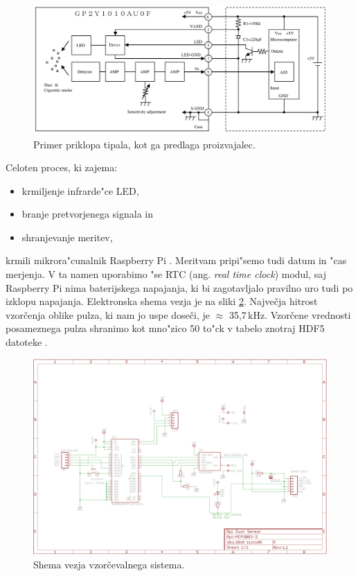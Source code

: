 \documentclass[12pt,a4paper]{article}
\begin{document}
\begin{figure}[H]
	\begin{center}
		\includegraphics[width=12cm]{integration-scheme.png}
		\caption{Primer priklopa tipala, kot ga predlaga proizvajalec.}
		\label{integration-scheme}
	\end{center}
\end{figure}

Celoten proces, ki zajema:
\begin{itemize}
	\item krmiljenje infrarde"ce LED,
	\item branje pretvorjenega signala in
	\item shranjevanje meritev,
\end{itemize}

krmili mikrora"cunalnik Raspberry Pi \cite{rbpi-wiki}. Meritvam pripi"semo tudi datum in "cas merjenja. V ta namen uporabimo "se RTC (ang. \textit{real time clock}) modul, saj Raspberry Pi nima baterijskega napajanja, ki bi zagotavljalo pravilno uro tudi po izklopu napajanja. Elektronska shema vezja je na sliki \ref{sl:shema-vezja}.
Največja hitrost vzorčenja oblike pulza, ki nam jo uspe doseči, je $ \approx $ 35,7\,kHz. Vzorčene vrednosti posameznega pulza shranimo kot mno"zico 50 to"ck v tabelo znotraj HDF5 datoteke \cite{hdf5}.


\begin{figure}[H]
	\begin{center}
		\includegraphics[width=12cm]{scheme.png}
		\caption{Shema vezja vzorčevalnega sistema.}
		\label{sl:shema-vezja}
	\end{center}
\end{figure}
\end{document}
